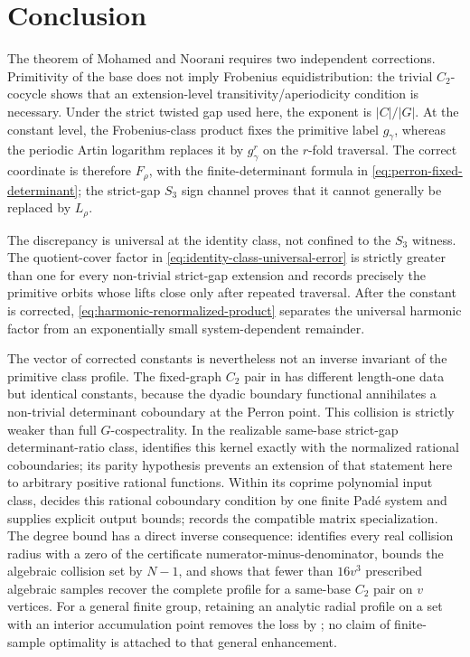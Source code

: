 \section{Conclusion}\label{sec:conclusion}

The theorem of Mohamed and Noorani requires two independent corrections.
Primitivity of the base does not imply Frobenius equidistribution: the
trivial \(C_2\)-cocycle shows that an extension-level
transitivity/aperiodicity condition is necessary.  Under the strict twisted
gap used here, the exponent is \(|C|/|G|\).  At the constant level, the
Frobenius-class product fixes the primitive label \(g_\gamma\), whereas the
periodic Artin logarithm replaces it by \(g_\gamma^r\) on the \(r\)-fold
traversal.  The correct coordinate is therefore \(F_\rho\), with the
finite-determinant formula in \eqref{eq:perron-fixed-determinant}; the strict-gap
\(S_3\) sign channel proves that it cannot generally be replaced by
\(L_\rho\).

The discrepancy is universal at the identity class, not confined to the
\(S_3\) witness.  The quotient-cover factor in
\eqref{eq:identity-class-universal-error} is strictly greater than one for
every non-trivial strict-gap extension and records precisely the primitive
orbits whose lifts close only after repeated traversal.  After the constant is
corrected, \eqref{eq:harmonic-renormalized-product} separates the universal
harmonic factor from an exponentially small system-dependent remainder.

The vector of corrected constants is nevertheless not an inverse invariant
of the primitive class profile.  The fixed-graph \(C_2\) pair in
 has different length-one data but identical
constants, because the dyadic boundary functional annihilates a non-trivial
determinant coboundary at the Perron point.  This collision is strictly weaker
than full \(G\)-cospectrality.  In the realizable same-base strict-gap
determinant-ratio class,  identifies this
kernel exactly with the normalized rational coboundaries; its parity hypothesis
prevents an extension of that statement here to arbitrary positive rational
functions.  Within its coprime polynomial input class,
 decides this rational
coboundary condition by one finite Pad\'e system and supplies explicit output
bounds;  records the compatible
matrix specialization.  The degree bound has a direct inverse consequence:
 identifies every real collision radius with
a zero of the certificate numerator-minus-denominator, bounds the algebraic
collision set by \(N-1\), and shows that fewer than \(16v^3\) prescribed
algebraic samples recover the complete profile for a same-base \(C_2\) pair
on \(v\) vertices.  For a general finite group, retaining an analytic radial
profile on a set with an interior accumulation point removes the loss by
; no claim of finite-sample optimality is
attached to that general enhancement.

